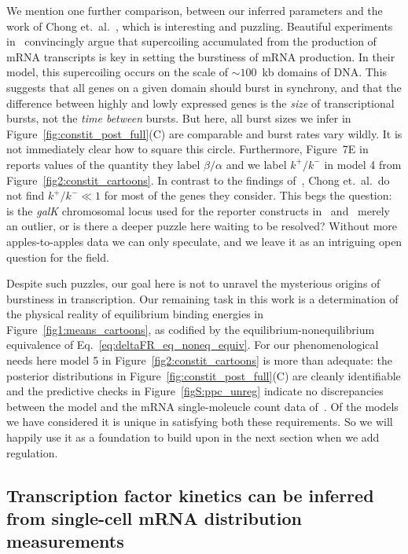 We mention one further comparison, between our inferred parameters and the
work of Chong et.\ al.~\cite{Chong2014}, which is interesting and puzzling.
Beautiful experiments in~\cite{Chong2014} convincingly argue that
supercoiling accumulated from the production of mRNA transcripts is key
in setting the burstiness of mRNA production.
In their model, this supercoiling occurs on the scale of $\sim100$~kb
domains of DNA. This suggests that all genes on a given domain should burst
in synchrony, and that the difference between highly and lowly expressed
genes is the \textit{size} of transcriptional bursts, not the
\textit{time between} bursts.
But here, all burst sizes we infer in Figure~\ref{fig:constit_post_full}(C)
are comparable and burst rates vary wildly. It is not immediately clear
how to square this circle. Furthermore, Figure~7E in~\cite{Chong2014}
reports values of the quantity they label $\beta/\alpha$ and we label
$k^+/k^-$ in model 4 from Figure~\ref{fig2:constit_cartoons}. In contrast
to the findings of~\cite{Razo-Mejia2020}, Chong et.\ al.\ do not find
$k^+/k^-\ll1$ for most of the genes they consider. This begs the question:
is the \textit{galK} chromosomal locus used for the reporter constructs
in~\cite{Razo-Mejia2020} and~\cite{Jones2014} merely an outlier,
or is there a deeper puzzle here waiting to be resolved? Without more
apples-to-apples data we can only speculate, and we leave it as an
intriguing open question for the field.

Despite such puzzles, our goal here is not to unravel the mysterious origins
of burstiness in transcription. Our remaining task in this work is a
determination of the physical reality of equilibrium binding energies in
Figure~\ref{fig1:means_cartoons}, as codified by the equilibrium-nonequilibrium
equivalence of Eq.~\ref{eq:deltaFR_eq_noneq_equiv}.
For our phenomenological needs here model 5 in
Figure~\ref{fig2:constit_cartoons} is more than adequate: the posterior
distributions in Figure~\ref{fig:constit_post_full}(C) are cleanly
identifiable and the predictive checks in Figure~\ref{figS:ppc_unreg}
indicate no discrepancies between the model and the mRNA single-moleucle
count data of~\cite{Jones2014}. Of the models we have considered it
is unique in satisfying both these requirements. So we will happily use
it as a foundation to build upon in the next section when we add regulation.

\subsection{Transcription factor kinetics can be inferred from single-cell mRNA
distribution measurements}\label{sec:rep_kinetics_inference}
